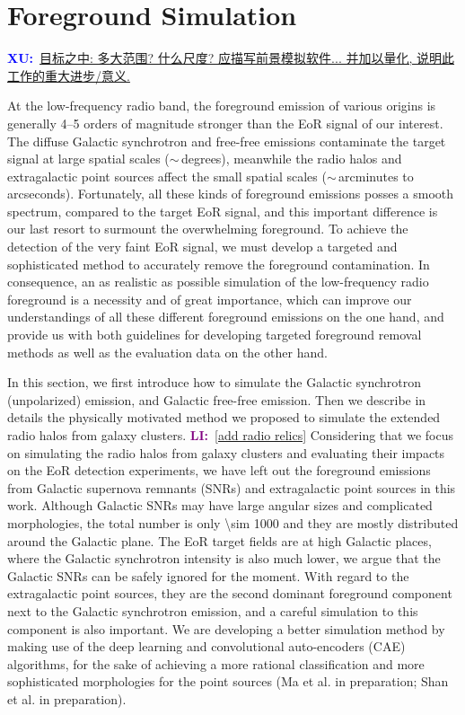 \documentclass[modern]{aastex61}
\newcommand{\XU}[1]{\textcolor{blue}{\textbf{XU:}}~\uline{#1}}
\newcommand{\LI}[1]{\textcolor{purple}{\textbf{LI:}}~\uline{#1}}
\begin{document}

\section{Foreground Simulation}
\label{sec:fg-simu}

\XU{目标之中: 多大范围? 什么尺度? 应描写前景模拟软件... 并加以量化,
  说明此工作的重大进步/意义.}

At the low-frequency radio band, the foreground emission of various
origins is generally \numrange{4}{5} orders of magnitude stronger
than the EoR signal of our interest.
The diffuse Galactic synchrotron and free-free emissions contaminate
the target signal at large spatial scales ($\sim\,$degrees),
meanwhile the radio halos and extragalactic point sources affect the
small spatial scales ($\sim\,$arcminutes to arcseconds).
Fortunately, all these kinds of foreground emissions posses a smooth
spectrum, compared to the target EoR signal, and this important
difference is our last resort to surmount the overwhelming foreground.
To achieve the detection of the very faint EoR signal, we must
develop a targeted and sophisticated method to accurately remove the
foreground contamination.
In consequence, an as realistic as possible simulation of the
low-frequency radio foreground is a necessity and of great importance,
which can improve our understandings of all these different foreground
emissions on the one hand, and provide us with both guidelines for
developing targeted foreground removal methods as well as the
evaluation data on the other hand.

In this section, we first introduce how to simulate the Galactic
synchrotron (unpolarized) emission, and Galactic free-free emission.
Then we describe in details the physically motivated method we proposed
to simulate the extended radio halos from galaxy clusters.
\LI{[add radio relics]}
Considering that we focus on simulating the radio halos from galaxy
clusters and evaluating their impacts on the EoR detection experiments,
we have left out the foreground emissions from Galactic supernova remnants
(SNRs) and extragalactic point sources in this work.
Although Galactic SNRs may have large angular sizes and complicated
morphologies, the total number is only \num{\sim 1000} \citep{li1991,anderson2017}
and they are mostly distributed around the Galactic plane.
The EoR target fields are at high Galactic places, where the
Galactic synchrotron intensity is also much lower, we argue that
the Galactic SNRs can be safely ignored for the moment.
With regard to the extragalactic point sources, they are the second
dominant foreground component next to the Galactic synchrotron emission,
and a careful simulation to this component is also important.
We are developing a better simulation method by making use of the
deep learning and convolutional auto-encoders (CAE) algorithms, for the
sake of achieving a more rational classification and more sophisticated
morphologies for the point sources
(Ma et al. in preparation; Shan et al. in preparation).
\end{document}
